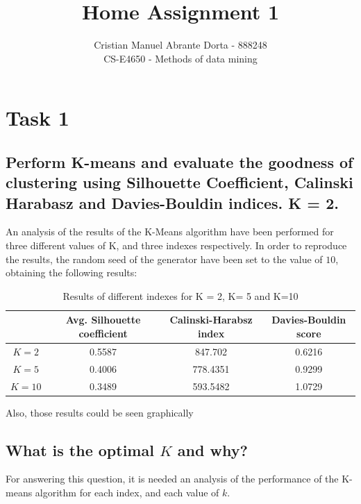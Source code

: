 \documentclass[12pt]{article}
\begin{document}
 
\title{Home Assignment 1}
\author{Cristian Manuel Abrante Dorta - 888248\\
CS-E4650 - Methods of data mining}

\maketitle
\section{Task 1}
\label{sec:task-1}

\subsection{Perform K-means and evaluate the goodness of clustering using
Silhouette Coefficient, Calinski Harabasz and Davies-Bouldin indices.
K = 2.}

An analysis of the results of the K-Means algorithm have been performed for three different values of K, and three indexes respectively. In order to reproduce the results, the random seed of the generator have been set to the value of $10$, obtaining the following results:

\begin{table}[h]
\centering
\begin{tabular}{c|ccc}
       & Avg. Silhouette coefficient & Calinski-Harabsz index & Davies-Bouldin score \\ \hline
$K = 2$  & 0.5587                 & 847.702                & 0.6216               \\
$K = 5$  & 0.4006                 & 778.4351               & 0.9299               \\
$K = 10$ & 0.3489                 & 593.5482               & 1.0729              \\

\end{tabular}
\caption{Results of different indexes for K = 2, K= 5 and K=10}
\end{table}

Also, those results could be seen graphically

\subsection{What is the optimal $K$ and why?}

For answering this question, it is needed an analysis of the performance of the K-means algorithm for each index, and each value of $k$.
\end{document}
